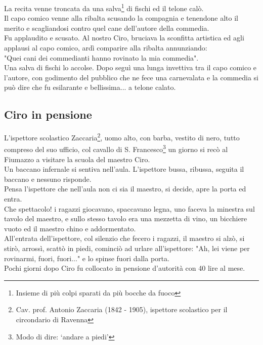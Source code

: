 La recita venne troncata da una salva\footnote{Insieme di più colpi sparati da più bocche da fuoco} di fischi ed il telone calò.\\
Il capo comico venne alla ribalta scusando la compagnia e tenendone alto il merito e scagliandosi contro quel cane dell'autore della commedia.\\
Fu applaudito e scusato. Al nostro Ciro, bruciava la sconfitta artistica ed agli applausi al capo comico, ardì comparire alla ribalta annunziando:\\
"Quei cani dei commedianti hanno rovinato la mia commedia".\\
Una salva di fischi lo accolse. Dopo seguì una lunga invettiva tra il capo comico e l'autore, con godimento del pubblico che ne fece una carnevalata e la commedia si può dire che fu esilarante e bellissima... a telone calato. 

\subsection{Ciro in pensione}
L'ispettore scolastico Zaccaria\footnote{Cav. prof. Antonio Zaccaria (1842 - 1905), ispettore scolastico per il circondario di Ravenna}, uomo alto, con barba, vestito di nero, tutto compreso del suo ufficio, col cavallo di S. Francesco\footnote{Modo di dire: ‘andare a piedi'} un giorno si recò al Fiumazzo a visitare la scuola del maestro Ciro.\\
Un baccano infernale si sentiva nell'aula. L'ispettore bussa, ribussa, seguita il baccano e nessuno risponde.\\
Pensa l'ispettore che nell'aula non ci sia il maestro, si decide, apre la porta ed entra.\\
Che spettacolo! i ragazzi giocavano, spaccavano legna, uno faceva la minestra sul tavolo del maestro, e sullo stesso tavolo era una mezzetta di vino, un bicchiere vuoto ed il maestro chino e addormentato.\\
All'entrata dell'ispettore, col silenzio che fecero i ragazzi, il maestro si alzò, si stirò, arrossì, scattò in piedi, cominciò ad urlare all'ispettore: "Ah, lei viene per rovinarmi, fuori, fuori..." e lo spinse fuori dalla porta.\\
Pochi giorni dopo Ciro fu collocato in pensione d'autorità con 40 lire al mese.
